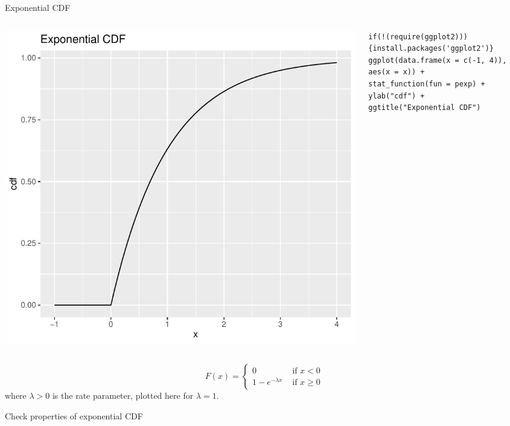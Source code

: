\documentclass[aspectratio=169,11pt]{beamer}
\begin{document}
\begin{frame}[fragile]{Exponential CDF}
\begin{columns}
\begin{column}{0.5\textwidth}
\begin{center}
\includegraphics[height=.5\textheight]{exp-cdf} 
\end{center}
\end{column}
\begin{column}{0.5\textwidth} 
\begin{lstlisting}
if(!(require(ggplot2))){install.packages('ggplot2')}
ggplot(data.frame(x = c(-1, 4)), aes(x = x)) +
stat_function(fun = pexp) +
ylab("cdf") +
ggtitle("Exponential CDF")
\end{lstlisting}
\end{column}
\end{columns}
\[
F\left(x\right) = \begin{cases}
	0 & \text{ if }x<0\\
	1 - e^{- \lambda x}  & \text{ if }x\ge 0
\end{cases}
\]
where $\lambda > 0$ is the rate parameter, plotted here for $\lambda=1$.

\end{frame}


\begin{frame}{Check properties of exponential CDF}

\end{frame}
\end{document}
